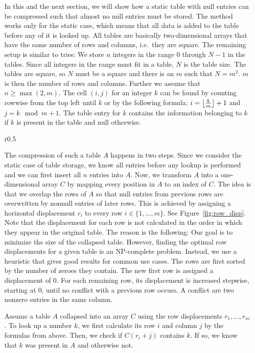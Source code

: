 In this and the next section, we will show how a static table with null entries can be compressed such that almost no null entries must be stored.
The method works only for the static case, which means that all data is added to the table before any of it is looked up.
All tables are basically two-dimensional arrays that have the same number of rows and columns, i.e.\ they are square.
The remaining setup is similar to tries:
We store $n$ integers in the range $0$ through $N - 1$ in the tables.
Since all integers in the range must fit in a table, $N$ is the table size.
The tables are square, so $N$ must be a square and there is an $m$ such that $N = m^2$.
$m$ is then the number of rows and columns.
Further we assume that $n \geq \max(2, m)$.
The cell $(i, j)$ for an integer $k$ can be found by counting rowwise from the top left until $k$ or by the following formula: $i = \left\lfloor \frac{k}{m} \right\rfloor + 1$ and $j = k \mod m + 1$.
The table entry for $k$ contains the information belonging to $k$ if $k$ is present in the table and null otherwise.

\begin{wrapfigure}{r}{0.5\textwidth}
  
	\caption{Rows of a table displaced and collapsed into a one-dimensional array. \label{fig:row_disp}}
\end{wrapfigure}

The compression of such a table $A$ happens in two steps.
Since we consider the static case of table storage, we know all entries before any lookup is performed and we can first insert all $n$ entries into $A$.
Now, we transform $A$ into a one-dimensional array $C$ by mapping every position in $A$ to an index of $C$.
The idea is that we overlap the rows of $A$ so that null entries from previous rows are overwritten by nonnull entries of later rows.
This is achieved by assigning a horizontal displacement $r_i$ to every row $i \in \{ 1, \ldots, m \}$.
See Figure~\ref{fig:row_disp}.
Note that the displacement for each row is not calculated in the order in which they appear in the original table.
The reason is the following:
Our goal is to minimize the size of the collapsed table.
However, finding the optimal row displacements for a given table is an NP-complete problem.
Instead, we use a heuristic that gives good results for common use cases.
The rows are first sorted by the number of zeroes they contain.
The new first row is assigned a displacement of 0.
For each remaining row, its displacement is increased stepwise, starting at 0, until no conflict with a previous row occurs.
A conflict are two nonzero entries in the same column.

Assume a table $A$ collapsed into an array $C$ using the row displacements $r_1, \ldots, r_m$.
To look up a number $k$, we first calculate its row $i$ and column $j$ by the formulas from above.
Then, we check if $C( r_i + j )$ contains $k$.
If so, we know that $k$ was present in $A$ and otherwise not.
